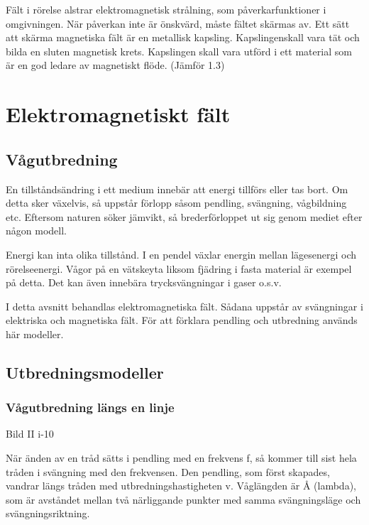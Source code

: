 Fält i rörelse alstrar elektromagnetisk strålning, som påverkarfunktioner i omgivningen.
När påverkan inte är önskvärd, måste fältet skärmas av. Ett sätt att skärma magnetiska
fält är en metallisk kapsling. Kapslingenskall vara tät och bilda en sluten magnetisk
krets. Kapslingen skall vara utförd i ett material som är en god ledare av magnetiskt
flöde.
(Jämför 1.3)

\cleardoublepage

\section{Elektromagnetiskt fält}

\subsection{Vågutbredning}

En tillståndsändring i ett medium innebär att energi tillförs eller tas bort. Om detta
sker växelvis, så uppstår förlopp såsom pendling, svängning, vågbildning etc.
Eftersom naturen söker jämvikt, så brederförloppet ut sig genom mediet efter någon modell.

Energi kan inta olika tillstånd. I en pendel växlar energin mellan lägesenergi och
rörelseenergi. Vågor på en vätskeyta liksom fjädring i fasta material är exempel på
detta. Det kan även innebära trycksvängningar i gaser o.s.v.

I detta avsnitt behandlas elektromagnetiska fält. Sådana uppstår av svängningar i
elektriska och magnetiska fält. För att förklara pendling och utbredning används här
modeller.

\subsection{Utbredningsmodeller}

\subsubsection{Vågutbredning längs en linje}

Bild II i-10

När änden av en tråd sätts i pendling med en frekvens f, så kommer till sist hela tråden i
svängning med den frekvensen. Den pendling, som först skapades, vandrar längs tråden med
utbredningshastigheten v. Våglängden är Å (lambda), som är avståndet mellan två
närliggande punkter med samma svängningsläge och svängningsriktning.

